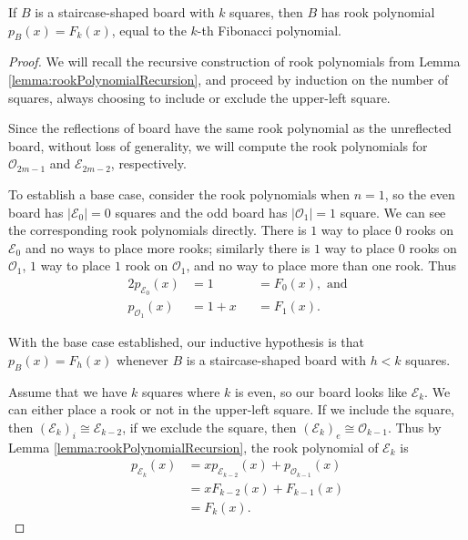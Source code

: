 \begin{lemma}
  If $B$ is a staircase-shaped board with $k$ squares, then
  $B$ has rook polynomial ${p_{B}(x) = F_{k}(x)}$, equal to the $k$-th
  Fibonacci polynomial.
  \label{lemma:staircaseIsFibonacci}
\end{lemma}
\begin{proof}
  We will recall the recursive construction of rook polynomials from
  Lemma \ref{lemma:rookPolynomialRecursion}, and proceed by
  induction on the number of squares, always choosing to include or exclude
  the upper-left square.

  Since the reflections of board have the same rook polynomial as the
  unreflected board, without loss of generality, we
  will compute the rook polynomials for
  $\mathcal{O}_{2m-1}$ and $\mathcal{E}_{2m-2}$, respectively.

  To establish a base case, consider the rook polynomials when $n = 1$, so
  the even board has $|\mathcal{E}_{0}| = 0$ squares and
  the odd board has $|\mathcal{O}_{1}| = 1$ square.
  We can see the corresponding rook polynomials directly. There is $1$ way to
  place $0$ rooks on $\mathcal{E}_{0}$ and no ways to place more rooks;
  similarly there is
  $1$ way to place $0$ rooks on $\mathcal{O}_{1}$,
  $1$ way to place $1$ rook on $\mathcal{O}_{1}$, and
  no way to place more than one rook. Thus \begin{alignat}{2}
    p_{\mathcal{E}_{0}}(x) &= 1     &&= F_0(x), \text{ and} \\
    p_{\mathcal{O}_{1}}(x) &= 1 + x &&= F_1(x).
  \end{alignat}

  With the base case established, our inductive hypothesis is that
  $p_{B}(x) = F_{h}(x)$ whenever $B$ is a
  staircase-shaped board with $h < k$ squares.

  Assume that we have $k$ squares where $k$ is even, so our board looks like
  $\mathcal{E}_{k}$. We can either place a rook or not in the upper-left square.
  If we include the square, then $(\mathcal{E}_{k})_i \cong \mathcal{E}_{k-2}$,
  if we exclude the square, then $(\mathcal{E}_{k})_e \cong \mathcal{O}_{k-1}$.
  Thus by Lemma \ref{lemma:rookPolynomialRecursion}, the rook polynomial of
  $\mathcal{E}_{k}$ is
  \begin{align}
    p_{\mathcal{E}_{k}}(x)
    &= xp_{\mathcal{E}_{k-2}}(x) + p_{\mathcal{O}_{k-1}}(x) \\
    &= xF_{k-2}(x) + F_{k-1}(x) \\
    &= F_{k}(x).
  \end{align}


\end{proof}

